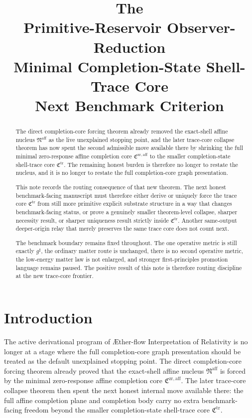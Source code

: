 \documentclass[11pt]{article}
\title{\textbf{The \TheoryName{}}\\[0.4em]
\large Primitive-Reservoir Observer-Reduction\\
\large Minimal Completion-State Shell-Trace Core\\
\large Next Benchmark Criterion}
\author{}
\date{}
\newcommand{\Aflow}{\AE{}ther-flow}
\newcommand{\TheoryName}{\Aflow{} Interpretation of Relativity}
\newcommand{\CompletedMetric}{g^{\sharp}}
\newcommand{\CompletionCore}{\mathfrak C^{\mathrm{zr,aff}}}
\newcommand{\TraceCore}{\mathfrak C^{\mathrm{tr}}}
\newcommand{\AffineNucleus}{\mathfrak N^{\mathrm{aff}}}
\begin{document}
\maketitle

\begin{abstract}
The direct completion-core forcing theorem already removed the exact-shell affine nucleus \(\AffineNucleus\) as the live unexplained stopping point, and the later trace-core collapse theorem has now spent the second admissible move available there by shrinking the full minimal zero-response affine completion core \(\CompletionCore\) to the smaller completion-state shell-trace core \(\TraceCore\). The remaining honest burden is therefore no longer to restate the nucleus, and it is no longer to restate the full completion-core graph presentation.

This note records the routing consequence of that new theorem. The next honest benchmark-facing manuscript must therefore either derive or uniquely force the trace core \(\TraceCore\) from still more primitive explicit substrate structure in a way that changes benchmark-facing status, or prove a genuinely smaller theorem-level collapse, sharper necessity result, or sharper uniqueness result strictly inside \(\TraceCore\). Another same-output deeper-origin relay that merely preserves the same trace core does not count next.

The benchmark boundary remains fixed throughout. The one operative metric is still exactly \(\CompletedMetric\), the ordinary matter route is unchanged, there is no second operative metric, the low-energy matter law is not enlarged, and stronger first-principles promotion language remains paused. The positive result of this note is therefore routing discipline at the new trace-core frontier.
\end{abstract}

\section{Introduction}

The active derivational program of \TheoryName{} is no longer at a stage where the full completion-core graph presentation should be treated as the default unexplained stopping point. The direct completion-core forcing theorem already proved that the exact-shell affine nucleus \(\AffineNucleus\) is forced by the minimal zero-response affine completion core \(\CompletionCore\). The later trace-core collapse theorem then spent the next honest internal move available there: the full affine completion plane and completion body carry no extra benchmark-facing freedom beyond the smaller completion-state shell-trace core \(\TraceCore\).
\end{document}

